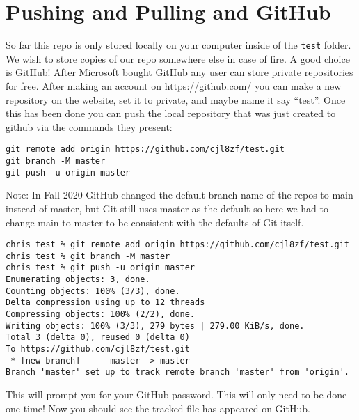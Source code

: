 \documentclass{article}
\begin{document}
\section{Pushing and Pulling and GitHub}
So far this repo is only stored locally on your computer inside of the
\lstinline{test} folder. We wish to store copies of our repo somewhere
else in case of fire. A good choice is GitHub! After Microsoft bought GitHub any
user can store private repositories for free. After making an account on
\href{https://github.com/}{https://github.com/} you can make a new
repository on the website, set it to private, and maybe name it say
``test''. Once this has been done you can push the local repository
that was just created to github via the commands they present:
\begin{lstlisting}
git remote add origin https://github.com/cjl8zf/test.git
git branch -M master
git push -u origin master
\end{lstlisting}
Note: In Fall 2020 GitHub changed the default branch name of the repos
to main instead of master, but Git still uses master as the
default so here we had to change main to master to be consistent with
the defaults of Git itself.
\begin{lstlisting}
chris test % git remote add origin https://github.com/cjl8zf/test.git 
chris test % git branch -M master
chris test % git push -u origin master 
Enumerating objects: 3, done.
Counting objects: 100% (3/3), done.
Delta compression using up to 12 threads
Compressing objects: 100% (2/2), done.
Writing objects: 100% (3/3), 279 bytes | 279.00 KiB/s, done.
Total 3 (delta 0), reused 0 (delta 0)
To https://github.com/cjl8zf/test.git
 * [new branch]      master -> master
Branch 'master' set up to track remote branch 'master' from 'origin'.
\end{lstlisting}
This will prompt you for your GitHub password. This will only need to
be done one time! Now you should see the tracked file has appeared on GitHub.
\end{document}
